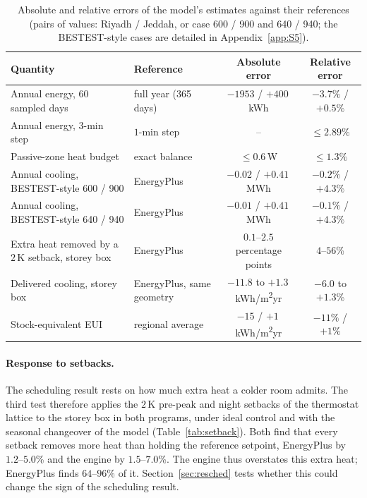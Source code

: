 \documentclass[10pt,a4paper,twocolumn]{article}
\theoremstyle{definition}
\begin{document}
\begin{table}[t]
\centering\footnotesize\setlength{\tabcolsep}{3pt}
\caption{Absolute and relative errors of the model's estimates against their references (pairs of values: Riyadh / Jeddah, or case 600 / 900 and 640 / 940; the BESTEST-style cases are detailed in Appendix~\ref{app:S5}).}
\label{tab:errors}
\begin{tabularx}{\linewidth}{L{4.6cm} L{4.2cm} C C}
\toprule
Quantity & Reference & Absolute error & Relative error \\
\midrule
Annual energy, 60 sampled days & full year (365 days) & $-1953$ / $+400\,$kWh & $-3.7\%$ / $+0.5\%$ \\
Annual energy, $3$-min step & $1$-min step & -- & $\le2.89\%$ \\
Passive-zone heat budget & exact balance & $\le0.6\,$W & $\le1.3\%$ \\
Annual cooling, BESTEST-style 600 / 900 & EnergyPlus & $-0.02$ / $+0.41\,$MWh & $-0.2\%$ / $+4.3\%$ \\
Annual cooling, BESTEST-style 640 / 940 & EnergyPlus & $-0.01$ / $+0.41\,$MWh & $-0.1\%$ / $+4.3\%$ \\
Extra heat removed by a $2\,$K setback, storey box & EnergyPlus & $0.1$--$2.5$ percentage points & $4$--$56$\% \\
Delivered cooling, storey box & EnergyPlus, same geometry & $-11.8$ to $+1.3$\,kWh/m\textsuperscript{2}yr & $-6.0$ to $+1.3$\% \\
Stock-equivalent EUI & regional average~\citep{stockmodel2020} & $-15$ / $+1\,$kWh/m\textsuperscript{2}yr & $-11\%$ / $+1\%$ \\
\bottomrule
\end{tabularx}
\end{table}

\paragraph{Response to setbacks.} The scheduling result rests on how much extra heat a colder room admits. The third test therefore applies the $2\,$K pre-peak and night setbacks of the thermostat lattice to the storey box in both programs, under ideal control and with the seasonal changeover of the model (Table~\ref{tab:setback}). Both find that every setback removes more heat than holding the reference setpoint, EnergyPlus by $1.2$--$5.0$\% and the engine by $1.5$--$7.0$\%. The engine thus overstates this extra heat; EnergyPlus finds $64$--$96$\% of it. Section~\ref{sec:resched} tests whether this could change the sign of the scheduling result.
\end{document}
